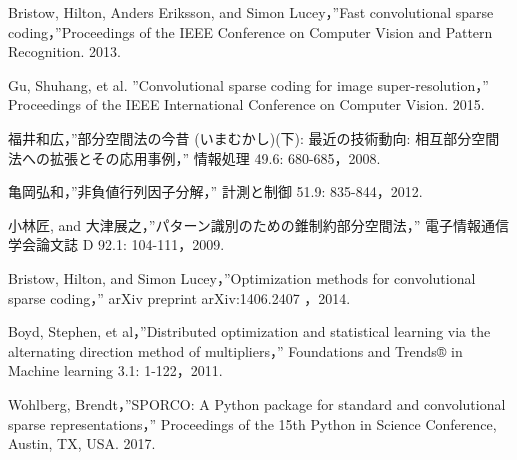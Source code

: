 \documentclass[a4paper,12pt,oneside]{ujbook}
\begin{document}
\begin{thebibliography}{9}
	Bristow, Hilton, Anders Eriksson, and Simon Lucey，”Fast convolutional sparse coding，”Proceedings of the IEEE Conference on Computer Vision and Pattern Recognition. 2013.
	
	Gu, Shuhang, et al. ”Convolutional sparse coding for image super-resolution，” Proceedings of the IEEE International Conference on Computer Vision. 2015.

	福井和広，”部分空間法の今昔 (いまむかし)(下): 最近の技術動向: 相互部分空間法への拡張とその応用事例，” 情報処理 49.6: 680-685，2008.
	
	亀岡弘和，”非負値行列因子分解，” 計測と制御 51.9: 835-844，2012.
	
	小林匠, and 大津展之，”パターン識別のための錐制約部分空間法，” 電子情報通信学会論文誌 D 92.1: 104-111，2009.
	
	Bristow, Hilton, and Simon Lucey，”Optimization methods for convolutional sparse coding，” arXiv preprint arXiv:1406.2407 ，2014.
	
	Boyd, Stephen, et al，”Distributed optimization and statistical learning via the alternating direction method of multipliers，” Foundations and Trends® in Machine learning 3.1: 1-122，2011.
	
	Wohlberg, Brendt，”SPORCO: A Python package for standard and convolutional sparse representations，” Proceedings of the 15th Python in Science Conference, Austin, TX, USA. 2017.

\end{thebibliography}
\end{document}
